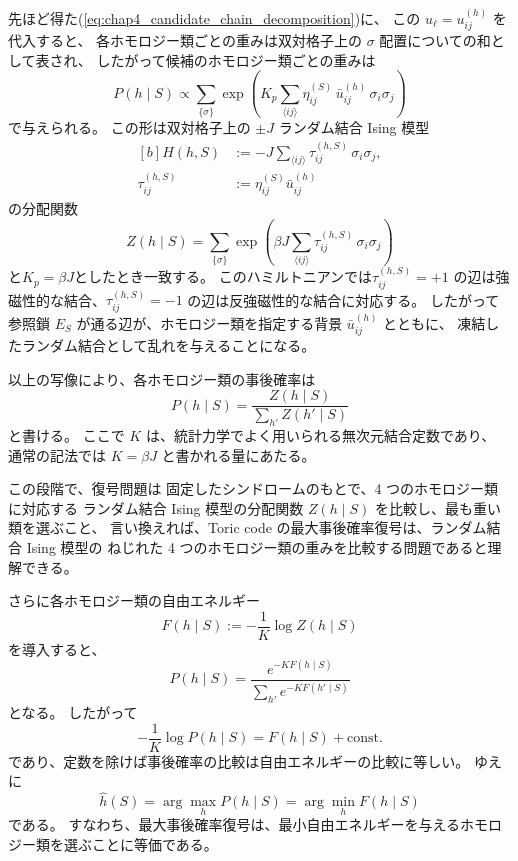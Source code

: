 \documentclass[../master.tex]{subfiles}
\begin{document}
先ほど得た(\ref{eq:chap4_candidate_chain_decomposition})に、
この \(u_\ell=u_{ij}^{(h)}\) を代入すると、
各ホモロジー類ごとの重みは双対格子上の \(\sigma\) 配置についての和として表され、
したがって候補のホモロジー類ごとの重みは
\begin{equation}
    P(h\mid S)
    \propto
    \sum_{\{\sigma\}}
    \exp\left(
    K_p\sum_{\langle ij\rangle}
    \eta_{ij}^{(S)}\,\bar u_{ij}^{(h)}\,\sigma_i\sigma_j
    \right)
\end{equation}
で与えられる。
この形は双対格子上の \(\pm J\) ランダム結合 Ising 模型
\begin{equation}\begin{aligned}[b]
    H(h,S)
    &:=-J\sum_{\langle ij\rangle} \tau_{ij}^{(h,S)}\,\sigma_i\sigma_j,\\
    \tau_{ij}^{(h,S)}&:=\eta_{ij}^{(S)}\bar u_{ij}^{(h)}
\end{aligned}\end{equation}
の分配関数
\begin{equation}
    Z(h\mid S)
    =
    \sum_{\{\sigma\}}
    \exp\left(
    \beta J\sum_{\langle ij\rangle}
    \tau_{ij}^{(h,S)}\,\sigma_i\sigma_j
    \right)
\end{equation}
と\(K_p = \beta J\)としたとき一致する。
このハミルトニアンでは\(\tau_{ij}^{(h,S)}=+1\) の辺は強磁性的な結合、\(\tau_{ij}^{(h,S)}=-1\) の辺は反強磁性的な結合に対応する。
したがって参照鎖 \(E_S\) が通る辺が、ホモロジー類を指定する背景 \(\bar u_{ij}^{(h)}\) とともに、
凍結したランダム結合として乱れを与えることになる。

以上の写像により、各ホモロジー類の事後確率は
\begin{equation}
    P(h\mid S)
    =
    \frac{Z(h\mid S)}{\sum_{h'}Z(h'\mid S)}
\end{equation}
と書ける。
ここで \(K\) は、統計力学でよく用いられる無次元結合定数であり、
通常の記法では \(K=\beta J\) と書かれる量にあたる。

この段階で、復号問題は
固定したシンドロームのもとで、4 つのホモロジー類に対応する
ランダム結合 Ising 模型の分配関数 \(Z(h\mid S)\) を比較し、最も重い類を選ぶこと、
言い換えれば、Toric code の最大事後確率復号は、ランダム結合 Ising 模型の
ねじれた 4 つのホモロジー類の重みを比較する問題であると理解できる。

さらに各ホモロジー類の自由エネルギー
\begin{equation}
    F(h\mid S):=-\frac{1}{K}\log Z(h\mid S)
\end{equation}
を導入すると、
\begin{equation}
    P(h\mid S)
    =
    \frac{e^{-KF(h\mid S)}}{\sum_{h'}e^{-KF(h'\mid S)}}
\end{equation}
となる。
したがって
\begin{equation}
    -\frac{1}{K}\log P(h\mid S)
    =
    F(h\mid S)+\text{const.}
\end{equation}
であり、定数を除けば事後確率の比較は自由エネルギーの比較に等しい。
ゆえに
\begin{equation}
    \hat h(S)=\arg\max_h P(h\mid S)=\arg\min_h F(h\mid S)
\end{equation}
である。
すなわち、最大事後確率復号は、最小自由エネルギーを与えるホモロジー類を選ぶことに等価である。
\end{document}
